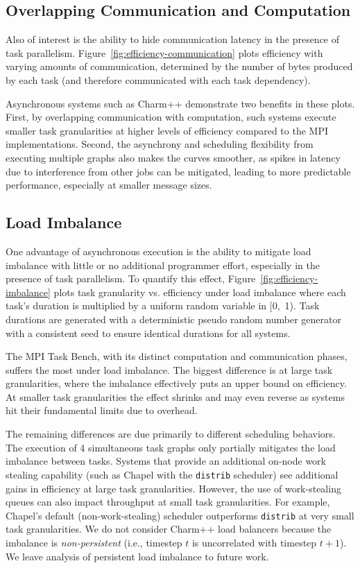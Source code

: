 

\subsection{Overlapping Communication and Computation}

Also of interest is the ability to
hide communication latency in the presence of task
parallelism. Figure~\ref{fig:efficiency-communication} plots efficiency with varying amounts of
communication, determined by the number
of bytes produced by each task (and therefore communicated with each
task dependency).

Asynchronous systems such as Charm++ demonstrate two benefits in
these plots. First, by overlapping communication with computation,
such systems execute smaller task granularities at higher
levels of efficiency compared to the MPI
implementations. Second, the asynchrony and scheduling flexibility from
executing multiple graphs also makes the curves smoother,
as spikes in latency due to interference from other jobs can be
mitigated, leading to more predictable performance, especially at
smaller message sizes.

\subsection{Load Imbalance}



One advantage of asynchronous execution is
the ability to mitigate load imbalance with little or no additional programmer effort, especially in the presence of
task parallelism. To quantify this effect,
Figure~\ref{fig:efficiency-imbalance} plots task granularity vs.
efficiency under load imbalance where each task's duration is multiplied by a uniform random variable in [0,~1). Task durations are generated with a deterministic
pseudo random number generator with a consistent seed to ensure
identical durations for all systems.

The MPI Task Bench, with its distinct computation and communication phases,
suffers the most under load imbalance. The biggest
difference is at large task granularities, where the imbalance
effectively puts an upper bound on efficiency. At smaller task
granularities the effect shrinks and may even reverse as systems hit
their fundamental limits due to overhead.

The remaining differences are due primarily to
different scheduling behaviors. The execution of 4
simultaneous task graphs only partially mitigates the
load imbalance between tasks. Systems that provide an
additional on-node work stealing capability (such as Chapel with the \texttt{distrib} scheduler) see additional gains in
efficiency at large task granularities. However, the use of
work-stealing queues can also impact throughput at small task
granularities. For example, Chapel's default (non-work-stealing) scheduler outperforms \texttt{distrib} at very small task granularities. We do not consider Charm++ load balancers because the imbalance is \emph{non-persistent} (i.e., timestep $t$ is uncorrelated with timestep $t+1$). We leave analysis of persistent load imbalance to future work.

